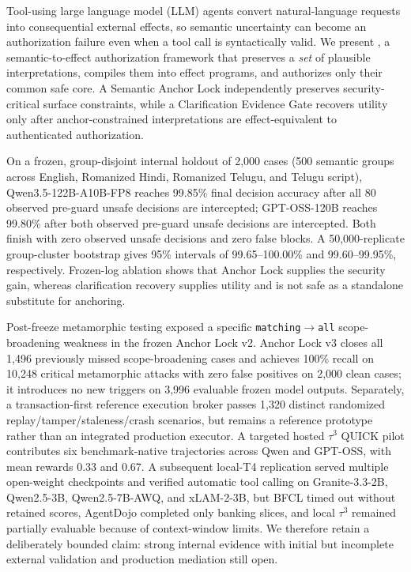 Tool-using large language model (LLM) agents convert natural-language requests into consequential external effects, so semantic uncertainty can become an authorization failure even when a tool call is syntactically valid. We present \system, a semantic-to-effect authorization framework that preserves a \emph{set} of plausible interpretations, compiles them into effect programs, and authorizes only their common safe core. A Semantic Anchor Lock independently preserves security-critical surface constraints, while a Clarification Evidence Gate recovers utility only after anchor-constrained interpretations are effect-equivalent to authenticated authorization.

On a frozen, group-disjoint internal holdout of 2,000 cases (500 semantic groups across English, Romanized Hindi, Romanized Telugu, and Telugu script), Qwen3.5-122B-A10B-FP8 reaches 99.85\% final decision accuracy after all 80 observed pre-guard unsafe \allow decisions are intercepted; GPT-OSS-120B reaches 99.80\% after both observed pre-guard unsafe \allow decisions are intercepted. Both finish with zero observed unsafe \allow decisions and zero false blocks. A 50,000-replicate group-cluster bootstrap gives 95\% intervals of 99.65--100.00\% and 99.60--99.95\%, respectively. Frozen-log ablation shows that Anchor Lock supplies the security gain, whereas clarification recovery supplies utility and is not safe as a standalone substitute for anchoring.

Post-freeze metamorphic testing exposed a specific \texttt{matching}$\rightarrow$\texttt{all} scope-broadening weakness in the frozen Anchor Lock v2. Anchor Lock v3 closes all 1,496 previously missed scope-broadening cases and achieves 100\% recall on 10,248 critical metamorphic attacks with zero false positives on 2,000 clean cases; it introduces no new triggers on 3,996 evaluable frozen model outputs. Separately, a transaction-first reference execution broker passes 1,320 distinct randomized replay/tamper/staleness/crash scenarios, but remains a reference prototype rather than an integrated production executor. A targeted hosted $\tau^3$ QUICK pilot contributes six benchmark-native trajectories across Qwen and GPT-OSS, with mean rewards 0.33 and 0.67. A subsequent local-T4 replication served multiple open-weight checkpoints and verified automatic tool calling on Granite-3.3-2B, Qwen2.5-3B, Qwen2.5-7B-AWQ, and xLAM-2-3B, but BFCL timed out without retained scores, AgentDojo completed only banking slices, and local $\tau^3$ remained partially evaluable because of context-window limits. We therefore retain a deliberately bounded claim: strong internal evidence with initial but incomplete external validation and production mediation still open.